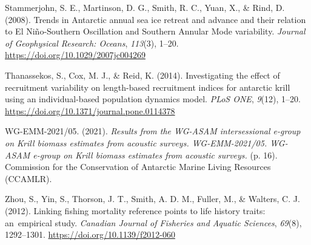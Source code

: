 \documentclass[
]{article}
\newlength{\cslhangindent}
\newlength{\cslentryspacingunit} %
\newenvironment{CSLReferences}[2] %
 {%
  \setlength{\parindent}{0pt}
  \ifodd #1
  \let\oldpar\par
  \def\par{\hangindent=\cslhangindent\oldpar}
  \fi
  \setlength{\parskip}{#2\cslentryspacingunit}
 }%
 {}
\begin{document}
\begin{CSLReferences}{1}{0}
\leavevmode{}%
Stammerjohn, S. E., Martinson, D. G., Smith, R. C., Yuan, X., \& Rind,
D. (2008). {Trends in Antarctic annual sea ice retreat and advance and
their relation to El Ni{ñ}o-Southern Oscillation and Southern Annular
Mode variability}. \emph{Journal of Geophysical Research: Oceans},
\emph{113}(3), 1--20. \url{https://doi.org/10.1029/2007jc004269}

\leavevmode{}%
Thanassekos, S., Cox, M. J., \& Reid, K. (2014). {Investigating the
effect of recruitment variability on length-based recruitment indices
for antarctic krill using an individual-based population dynamics
model}. \emph{PLoS ONE}, \emph{9}(12), 1--20.
\url{https://doi.org/10.1371/journal.pone.0114378}

\leavevmode{}%
WG-EMM-2021/05. (2021). \emph{{Results from the WG-ASAM intersessional
e-group on Krill biomass estimates from acoustic surveys.
WG-EMM-2021/05. WG-ASAM e-group on Krill biomass estimates from acoustic
surveys.}} (p. 16). Commission for the Conservation of Antarctic Marine
Living Resources (CCAMLR).

\leavevmode{}%
Zhou, S., Yin, S., Thorson, J. T., Smith, A. D. M., Fuller, M., \&
Walters, C. J. (2012). {Linking fishing mortality reference points to
life history traits: an~empirical study}. \emph{Canadian Journal of
Fisheries and Aquatic Sciences}, \emph{69}(8), 1292--1301.
\url{https://doi.org/10.1139/f2012-060}

\end{CSLReferences}
\end{document}
